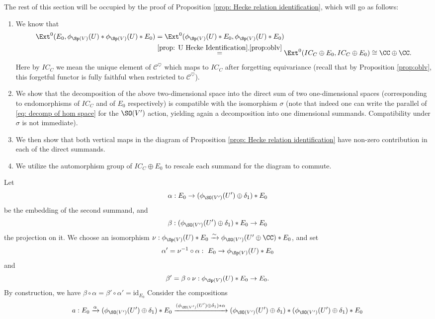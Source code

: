 \documentclass[11pt]{article}
\begin{document}
The rest of this section will be occupied by the proof of Proposition \ref{prop: Hecke relation identification}, which will go as follows:
\begin{enumerate}
    \item We know that
    \begin{equation}
        \begin{aligned}\label{eq: decomp of hom space}
            \Ext^0(E_0, \phi_{\Sp(V)}(U)*\phi_{\Sp(V)}(U)*E_0) &= \Ext^0(\phi_{\Sp(V)}(U)*E_0, \phi_{\Sp(V)}(U)*E_0) \\&\stackrel{\ref{prop: U Hecke Identification}, \ref{prop:oblv}}{=} \Ext^0(IC_C\oplus E_0, IC_C\oplus E_0)\cong \CC\oplus \CC. 
        \end{aligned}
    \end{equation}
    Here by $IC_C$ we mean the unique element of $\mathcal{C}^\heartsuit$ which maps to $IC_C$ after forgetting equivariance (recall that by Proposition \ref{prop:oblv}, this forgetful functor is fully faithful when restricted to $\mathcal{C}^\heartsuit$).
    \item We show that the decomposition of the above two-dimensional space into the direct sum of two one-dimensional spaces (corresponding to endomorphisms of $IC_C$ and of $E_0$ respectively) is compatible with the isomorphism $\sigma$ (note that indeed one can write the parallel of \eqref{eq: decomp of hom space} for the $\SO(V')$ action, yielding again a decomposition into one dimensional summands. Compatibility under $\sigma$ is not immediate).
    \item We then show that both vertical maps in the diagram of Proposition \ref{prop: Hecke relation identification} have non-zero contribution in each of the direct summands.
    \item We utilize the automorphism group of $IC_C\oplus E_0$ to rescale each summand for the diagram to commute.
\end{enumerate}
Let $$\alpha:E_0\to (\phi_{\SO(V')}(U')\oplus \delta_1)*E_0$$ be the embedding of the second summand, and $$\beta:(\phi_{\SO(V')}(U')\oplus \delta_1)*E_0\to E_0$$ the projection on it.
We choose an isomorphism $\nu:\phi_{\Sp(V)}(U)*E_0\xrightarrow{\sim} \phi_{\SO(V')}(U'\oplus \CC)*E_0$, and set $$\alpha' = \nu^{-1}\circ \alpha:\ E_0\to \phi_{\Sp(V)}(U)*E_0$$ and $$\beta' = \beta\circ \nu: \phi_{\Sp(V)}(U)*E_0\to E_0.$$
By construction, we have $\beta\circ\alpha=\beta'\circ\alpha'=\mathrm{id}_{E_0}$
Consider the compositions
$$a:E_0\xrightarrow{\alpha} (\phi_{\SO(V')}(U')\oplus \delta_1)*E_0\xrightarrow{(\phi_{\SO(V')}(U')\oplus \delta_1)*\alpha} (\phi_{\SO(V')}(U')\oplus \delta_1)*(\phi_{\SO(V')}(U')\oplus \delta_1)*E_0$$
\end{document}
